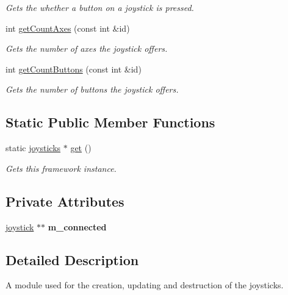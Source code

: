 \begin{DoxyCompactItemize}
\begin{DoxyCompactList}\small\item\em Gets the whether a button on a joystick is pressed. \end{DoxyCompactList}\item 
int \hyperlink{classflounder_1_1joysticks_abe58d868cb70e9d7f2a10eb0f1b967e1}{get\+Count\+Axes} (const int \&id)
\begin{DoxyCompactList}\small\item\em Gets the number of axes the joystick offers. \end{DoxyCompactList}\item 
int \hyperlink{classflounder_1_1joysticks_af502daffac227f63e673ed3f45850380}{get\+Count\+Buttons} (const int \&id)
\begin{DoxyCompactList}\small\item\em Gets the number of buttons the joystick offers. \end{DoxyCompactList}\end{DoxyCompactItemize}
\subsection*{Static Public Member Functions}
\begin{DoxyCompactItemize}
\item 
static \hyperlink{classflounder_1_1joysticks}{joysticks} $\ast$ \hyperlink{classflounder_1_1joysticks_a2c47c69053bf582ee6eb22d135d71084}{get} ()
\begin{DoxyCompactList}\small\item\em Gets this framework instance. \end{DoxyCompactList}\end{DoxyCompactItemize}
\subsection*{Private Attributes}
\begin{DoxyCompactItemize}
\item 
\mbox{\label{classflounder_1_1joysticks_a9000954268ff0dc151b34904514e2942}} 
\hyperlink{structflounder_1_1joysticks_1_1joystick}{joystick} $\ast$$\ast$ {\bfseries m\+\_\+connected}
\end{DoxyCompactItemize}


\subsection{Detailed Description}
A module used for the creation, updating and destruction of the joysticks. 



